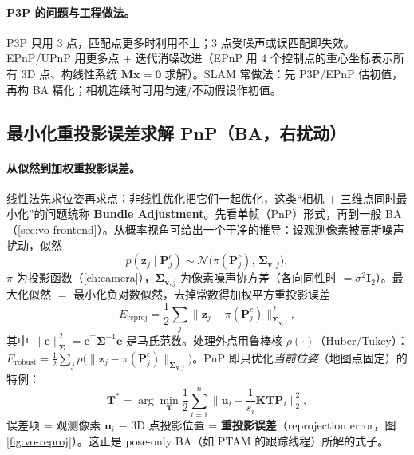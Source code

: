 \paragraph{P3P 的问题与工程做法\cite{gaoxiang2019slam14}。}P3P 只用 $3$ 点，匹配点更多时利用不上；$3$ 点受噪声或误匹配即失效。EPnP/UPnP 用更多点 + 迭代消噪改进（EPnP 用 $4$ 个控制点的重心坐标表示所有 3D 点、构线性系统 $\mathbf{M}\mathbf{x}=\mathbf{0}$ 求解）。SLAM 常做法：先 P3P/EPnP 估初值，再构 BA 精化；相机连续时可用匀速/不动假设作初值。

\subsection{最小化重投影误差求解 PnP（BA，右扰动）}
\label{sec:vo-pnp-ba}

\paragraph{从似然到加权重投影误差。}线性法先求位姿再求点；非线性优化把它们一起优化，这类“相机 + 三维点同时最小化”的问题统称 \textbf{Bundle Adjustment}\cite{carlone2026handbook,gaoxiang2019slam14}。先看单帧（PnP）形式，再到一般 BA（\cref{sec:vo-frontend}）。从概率视角可给出一个干净的推导\cite{carlone2026handbook}：设观测像素被高斯噪声扰动，似然
\begin{equation}
  p(\mathbf{z}_j\mid\mathbf{P}_j^c)\sim\mathcal{N}\!\big(\pi(\mathbf{P}_j^c),\,\boldsymbol{\Sigma}_{\mathbf v,j}\big),
  \label{eq:vo-likelihood}
\end{equation}
$\pi$ 为投影函数（\cref{ch:camera}），$\boldsymbol{\Sigma}_{\mathbf v,j}$ 为像素噪声协方差（各向同性时 $=\sigma^2\mathbf{I}_2$）。最大化似然 $=$ 最小化负对数似然，去掉常数得加权平方重投影误差
\begin{equation}
  E_{\text{reproj}}=\frac12\sum_j\big\|\mathbf{z}_j-\pi(\mathbf{P}_j^c)\big\|_{\boldsymbol{\Sigma}_{\mathbf v,j}}^2,
  \label{eq:vo-reproj-cost}
\end{equation}
其中 $\|\mathbf{e}\|_{\boldsymbol{\Sigma}}^2=\mathbf{e}^\top\boldsymbol{\Sigma}^{-1}\mathbf{e}$ 是马氏范数。处理外点用鲁棒核 $\rho(\cdot)$（Huber/Tukey）：$E_{\text{robust}}=\tfrac12\sum_j\rho\big(\|\mathbf{z}_j-\pi(\mathbf{P}_j^c)\|_{\boldsymbol{\Sigma}_{\mathbf v,j}}\big)$。PnP 即只优化\emph{当前位姿}（地图点固定）的特例\cite{carlone2026handbook}：
\begin{equation}
  \mathbf{T}^*=\arg\min_{\mathbf{T}}\frac12\sum_{i=1}^{n}\Big\|\mathbf{u}_i-\frac1{s_i}\mathbf{K}\mathbf{T}\mathbf{P}_i\Big\|_2^2,
  \label{eq:vo-pnp-ba}
\end{equation}
误差项 = 观测像素 $\mathbf{u}_i$ $-$ 3D 点投影位置 = \textbf{重投影误差}（reprojection error，图 \ref{fig:vo-reproj}）。这正是 pose-only BA（如 PTAM 的跟踪线程）所解的式子\cite{carlone2026handbook}。

